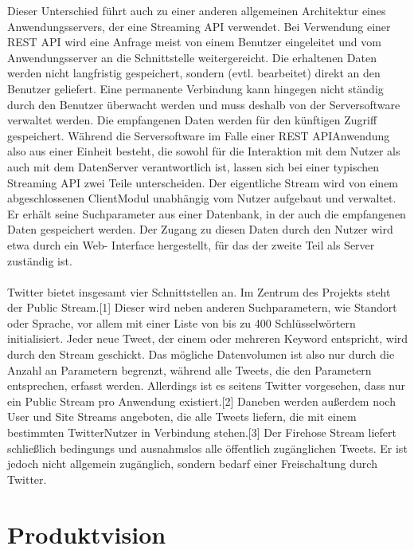 Dieser Unterschied führt auch zu einer anderen allgemeinen Architektur eines
Anwendungsservers, der eine Streaming API verwendet. Bei Verwendung einer REST API wird
eine Anfrage meist von einem Benutzer eingeleitet und vom Anwendungsserver an die
Schnittstelle weitergereicht. Die erhaltenen Daten werden nicht langfristig gespeichert,
sondern (evtl. bearbeitet) direkt an den Benutzer geliefert. Eine permanente Verbindung kann 
hingegen nicht ständig durch den Benutzer überwacht werden und muss deshalb von der 
Serversoftware verwaltet werden. Die empfangenen Daten werden für den künftigen Zugriff 
gespeichert. Während die Serversoftware im Falle einer REST API­Anwendung also aus einer Einheit 
besteht, die sowohl für die Interaktion mit dem Nutzer als auch mit dem Daten­Server verantwortlich
ist, lassen sich bei einer typischen Streaming API zwei Teile unterscheiden. Der eigentliche
Stream wird von einem abgeschlossenen Client­Modul unabhängig vom Nutzer aufgebaut und verwaltet. Er 
erhält seine Suchparameter aus einer Datenbank, in der auch die empfangenen Daten
gespeichert werden. Der Zugang zu diesen Daten durch den Nutzer wird etwa durch ein Web-
Interface hergestellt, für das der zweite Teil als Server zuständig ist. 
\\\\
 Twitter bietet insgesamt vier Schnittstellen an. Im 
Zentrum des Projekts steht der Public Stream.[1] Dieser wird neben anderen
Suchparametern, wie Standort oder Sprache, vor allem mit einer Liste von bis zu 400
Schlüsselwörtern initialisiert. Jeder neue Tweet, der einem oder mehreren Keyword entspricht,
wird durch den Stream geschickt. Das mögliche Datenvolumen ist also nur durch die Anzahl an
Parametern begrenzt, während alle Tweets, die den Parametern entsprechen, erfasst werden.
Allerdings ist es seitens Twitter vorgesehen, dass nur ein Public Stream pro Anwendung
existiert.[2] Daneben werden außerdem noch User und Site Streams angeboten, die alle Tweets 
liefern, die mit einem bestimmten Twitter­Nutzer in Verbindung stehen.[3] Der Firehose Stream
liefert schließlich bedingungs­ und ausnahmslos alle öffentlich zugänglichen Tweets. Er ist jedoch 
nicht allgemein zugänglich, sondern bedarf einer Freischaltung durch Twitter.

\section{Produktvision}

